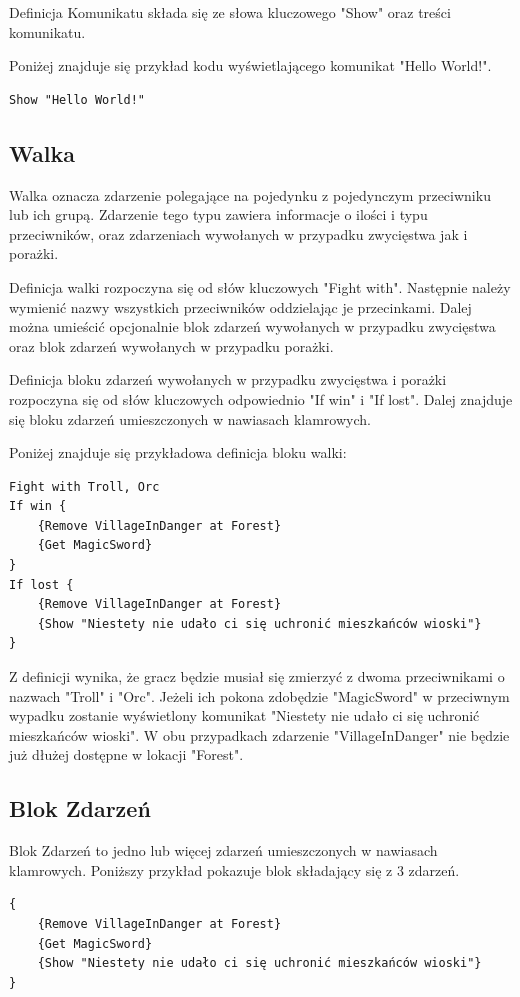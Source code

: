 \documentclass	{xmgr}
\begin{document}
Definicja Komunikatu składa się ze słowa kluczowego "Show" oraz treści komunikatu.

Poniżej znajduje się przykład kodu wyświetlającego komunikat "Hello World!".
\begin{lstlisting}
Show "Hello World!"
\end{lstlisting}
\subsection*{Walka}
Walka oznacza zdarzenie polegające na pojedynku z pojedynczym przeciwniku lub ich grupą. Zdarzenie tego typu zawiera informacje o ilości i typu przeciwników, oraz zdarzeniach wywołanych w przypadku zwycięstwa jak i porażki.

Definicja walki rozpoczyna się od słów kluczowych "Fight with". Następnie należy wymienić nazwy wszystkich przeciwników oddzielając je przecinkami. Dalej można umieścić opcjonalnie blok zdarzeń wywołanych w przypadku zwycięstwa oraz blok zdarzeń wywołanych w przypadku porażki.

Definicja bloku zdarzeń wywołanych w przypadku zwycięstwa i porażki rozpoczyna się od słów kluczowych odpowiednio "If win" i "If lost". Dalej znajduje się bloku zdarzeń umieszczonych w nawiasach klamrowych.

Poniżej znajduje się przykładowa definicja bloku walki:
\begin{lstlisting}
Fight with Troll, Orc
If win {
	{Remove VillageInDanger at Forest}
	{Get MagicSword}
}
If lost {
	{Remove VillageInDanger at Forest}
	{Show "Niestety nie udało ci się uchronić mieszkańców wioski"}
}
\end{lstlisting}
Z definicji wynika, że gracz będzie musiał się zmierzyć z dwoma przeciwnikami o nazwach "Troll" i "Orc". Jeżeli ich pokona zdobędzie "MagicSword" w przeciwnym wypadku zostanie wyświetlony komunikat "Niestety nie udało ci się uchronić mieszkańców wioski". W obu przypadkach zdarzenie "VillageInDanger" nie będzie już dłużej dostępne w lokacji "Forest".

\subsection*{Blok Zdarzeń}
Blok Zdarzeń to jedno lub więcej zdarzeń umieszczonych w nawiasach klamrowych.
Poniższy przykład pokazuje blok składający się z 3 zdarzeń.
\begin{lstlisting}
{
	{Remove VillageInDanger at Forest}
	{Get MagicSword}
	{Show "Niestety nie udało ci się uchronić mieszkańców wioski"}
}
\end{lstlisting}
\end{document}
